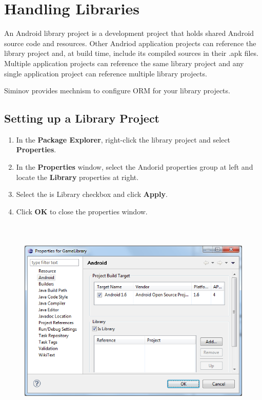 \newpage
\chapter {\Large{Handling Libraries}}

An Android library project is a development project that holds shared Android source code and resources. Other Andriod application projects can reference the library project and, at build time, include its compiled sources in their .apk files. Multiple application projects can reference the same library project and any single application project can reference multiple library projects.

\par
Siminov provides mechnism to configure ORM for your library projects. 


\section{Setting up a Library Project}

\begin{enumerate}

	\item \small In the \textbf{Package Explorer}, right-click the library project and select \textbf{Properties}.

	\item \small In the \textbf{Properties} window, select the Andorid properties group at left and locate the \textbf{Library} properties at right.

	\item \small Select the is Library checkbox and click \textbf{Apply}.

	\item \small Click \textbf{OK} to close the properties window.

\end{enumerate}

		\begin{figure}[!htbp]
			\centering
				\includegraphics[height=10cm]{Resources/setting_up_a_library_project.png}
		\end{figure}


